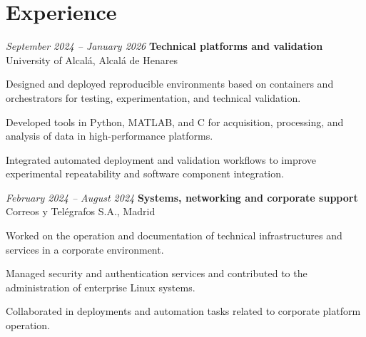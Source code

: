 \vspace{-7pt}

\section{Experience}

\begin{twocolentry}{\textit{September 2024 – January 2026}}
	\textbf{Technical platforms and validation} \\
	University of Alcalá, Alcalá de Henares
\end{twocolentry}
\begin{onecolentry}
	\begin{highlights}
		\item Designed and deployed reproducible environments based on containers and orchestrators for testing, experimentation, and technical validation.
		\item Developed tools in Python, MATLAB, and C for acquisition, processing, and analysis of data in high-performance platforms.
		\item Integrated automated deployment and validation workflows to improve experimental repeatability and software component integration.
	\end{highlights}
\end{onecolentry}

\vspace{0.2 cm}

\begin{twocolentry}{\textit{February 2024 – August 2024}}
	\textbf{Systems, networking and corporate support} \\
	Correos y Telégrafos S.A., Madrid
\end{twocolentry}
\begin{onecolentry}
	\begin{highlights}
		\item Worked on the operation and documentation of technical infrastructures and services in a corporate environment.
		\item Managed security and authentication services and contributed to the administration of enterprise Linux systems.
		\item Collaborated in deployments and automation tasks related to corporate platform operation.
	\end{highlights}
\end{onecolentry}

\vspace{0.2 cm}

